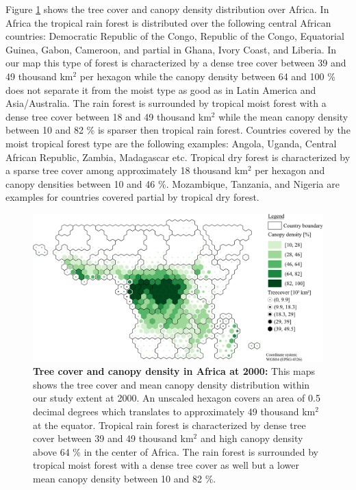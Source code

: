 			Figure \ref{fig:africa_tree_cover} shows the tree cover and canopy density distribution over Africa. In Africa the tropical rain forest is distributed over the following central African countries: Democratic Republic of the Congo, Republic of the Congo, Equatorial Guinea, Gabon, Cameroon, and partial in Ghana, Ivory Coast, and Liberia. In our map this type of forest is characterized by a dense tree cover between 39 and 49 thousand km$^2$ per hexagon while the canopy density between 64 and 100 \% does not separate it from the moist type as good as in Latin America and Asia/Australia. The rain forest is surrounded by tropical moist forest with a dense tree cover between 18 and 49 thousand km$^2$ while the mean canopy density between 10 and 82 \% is sparser then tropical rain forest. Countries covered by the moist tropical forest type are the following examples: Angola, Uganda, Central African Republic, Zambia, Madagascar etc. Tropical dry forest is characterized by a sparse tree cover among approximately 18 thousand km$^2$ per hexagon and canopy densities between 10 and 46 \%. Mozambique, Tanzania, and Nigeria are examples for countries covered partial by tropical dry forest.
			\begin{figure}[ht]
				\centering
				\includegraphics[scale=1.]{img/africa_treecover_frameless}
				\caption[Tree cover and canopy density in Africa at 2000]{\textbf{Tree cover and canopy density in Africa at 2000:} This maps shows the tree cover and mean canopy density distribution within our study extent at 2000. An unscaled hexagon covers an area of 0.5 decimal degrees which translates to approximately 49 thousand km$^2$ at the equator. Tropical rain forest is characterized by dense tree cover between 39 and 49 thousand km$^2$ and high canopy density above 64 \% in the center of Africa. The rain forest is surrounded by tropical moist forest with a dense tree cover as well but a lower mean canopy density between 10 and 82 \%.}
				\label{fig:africa_tree_cover}
			\end{figure}

